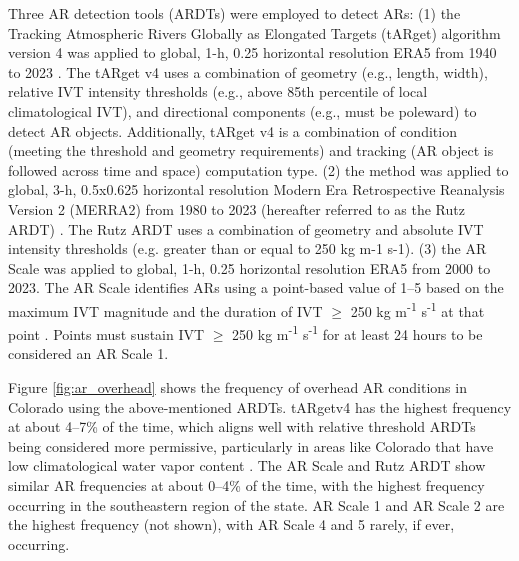 \documentclass[draft]{agujournal2019}
\begin{document}
Three AR detection tools (ARDTs) were employed to detect ARs: (1) the Tracking Atmospheric Rivers Globally as Elongated Targets (tARget) algorithm version 4 was applied to global, 1-h, 0.25\textdegree{} horizontal resolution ERA5 from 1940 to 2023 \cite{Guan2024AERA5}. The tARget v4 uses a combination of geometry (e.g., length, width), relative IVT intensity thresholds (e.g., above 85th percentile of local climatological IVT), and directional components (e.g., must be poleward) to detect AR objects. Additionally, tARget v4 is a combination of condition (meeting the threshold and geometry requirements) and tracking (AR object is followed across time and space) computation type. (2) the  method was applied to global, 3-h, 0.5\textdegree{}x0.625\textdegree{} horizontal resolution Modern Era Retrospective Reanalysis Version 2 (MERRA2) from 1980 to 2023 (hereafter referred to as the Rutz ARDT) \cite{Bosilovich2015, Gelaro2017}. The Rutz ARDT uses a combination of geometry and absolute IVT intensity thresholds (e.g. greater than or equal to 250 kg m-1 s-1). (3) the AR Scale \cite{MartinRalph2019} was applied to global, 1-h, 0.25\textdegree{} horizontal resolution ERA5 from 2000 to 2023. The AR Scale identifies ARs using a point-based value of 1--5 based on the maximum IVT magnitude and the duration of IVT $\geq$ 250 kg m\textsuperscript{-1} s\textsuperscript{-1} at that point \cite{MartinRalph2019}. Points must sustain IVT $\geq$ 250 kg m\textsuperscript{-1} s\textsuperscript{-1} for at least 24 hours to be considered an AR Scale 1. 

Figure \ref{fig:ar_overhead} shows the frequency of overhead AR conditions in Colorado using the above-mentioned ARDTs.  tARgetv4 has the highest frequency at about 4--7\% of the time, which aligns well with relative threshold ARDTs being considered more permissive, particularly in areas like Colorado that have low climatological water vapor content \cite{Rutz2019ARTMIP}. The AR Scale and Rutz ARDT show similar AR frequencies at about 0--4\% of the time, with the highest frequency occurring in the southeastern region of the state. AR Scale 1 and AR Scale 2 are the highest frequency (not shown), with AR Scale 4 and 5 rarely, if ever, occurring. 
\end{document}
